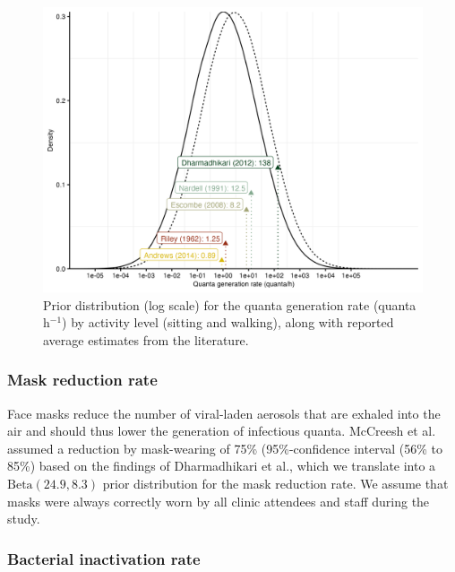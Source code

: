 \documentclass[fleqn,11pt]{wlscirep_supp}
\begin{document}
\begin{figure}[!htpb]
    \centering
    \includegraphics{results/inputs/quanta-generation-rate.png}
    \caption[Prior distribution for the quanta generation rate]{Prior distribution (log scale) for the quanta generation rate (quanta h$^{-1}$) by activity level (sitting and walking), along with reported average estimates from the literature\cite{Andrews2014JID,Riley1962ARRD,Escombe2008PLoSMed,Nardell1991ARRD,Dharmadhikari2012AJRCCM}.}
    \label{fig:quanta-distribution}
\end{figure}

\subsubsection{Mask reduction rate}

Face masks reduce the number of viral-laden aerosols that are exhaled into the air\cite{Milton2013PLoSPathogens,Leung2020NatMed} and should thus lower the generation of infectious quanta. McCreesh et al. assumed a reduction by mask-wearing of 75\% (95\%-confidence interval (56\% to 85\%) based on the findings of Dharmadhikari et al.\cite{Dharmadhikari2012AJRCCM}, which we translate into a $\mathrm{Beta}(24.9, 8.3)$ prior distribution for the mask reduction rate. We assume that masks were always correctly worn by all clinic attendees and staff during the study. 

\subsubsection{Bacterial inactivation rate}
\end{document}
